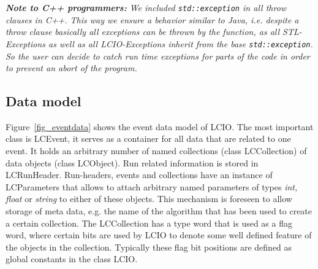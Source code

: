 \documentclass[twoside]{article}
\begin{document}
\vspace{\baselineskip}
{\it {\bf Note to C++ programmers:} We included \verb$std::exception$ in all {\em throw} clauses in 
C++. This way we ensure a behavior similar to Java, i.e. despite a {\em throw}
clause basically all exceptions can be thrown by the function, as all STL-Exceptions 
as well as all LCIO-Exceptions inherit from the base \verb$std::exception$. So the user can decide to
catch {\em run time} exceptions for parts of the code in order to prevent an abort of the program. 
}

\subsection{Data model \label{sec_datamodel}}

Figure~\ref{fig_eventdata} shows the event data model of LCIO. The most important class is LCEvent, it serves as a 
container for all data that are related to one event. It holds an arbitrary number of named collections 
(class LCCollection) of data objects (class LCObject). 
Run related information is stored in LCRunHeader. Run-headers, events and collections have an instance of 
LCParameters that allows to attach arbitrary named parameters of types  \textit{int, float} or \textit{string}
to either of these objects. This mechanism is foreseen to allow storage of meta data, e.g. the name of the 
algorithm that has been used to create a certain collection.
The LCCollection has a type word that is used as a flag word, where certain bits are used by LCIO to denote some
well defined feature of the objects in the collection. Typically these flag bit positions are defined as global
constants in the class LCIO.
\end{document}
